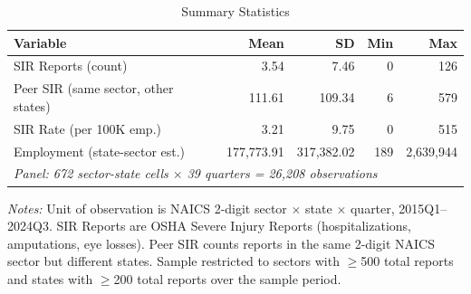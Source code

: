 \begin{table}[t]
\centering
\caption{Summary Statistics}\label{tab:summary}
\begin{tabular}{lrrrr}
\toprule
Variable & Mean & SD & Min & Max \\
\midrule
SIR Reports (count) & 3.54 & 7.46 & 0 & 126 \\
Peer SIR (same sector, other states) & 111.61 & 109.34 & 6 & 579 \\
SIR Rate (per 100K emp.) & 3.21 & 9.75 & 0 & 515 \\
Employment (state-sector est.) & 177,773.91 & 317,382.02 & 189 & 2,639,944 \\
\midrule
\multicolumn{5}{l}{\textit{Panel: 672 sector-state cells $\times$ 39 quarters = 26,208 observations}} \\
\bottomrule
\end{tabular}
\begin{tablenotes}[flushleft]\footnotesize
\item \textit{Notes:} Unit of observation is NAICS 2-digit sector $\times$ state $\times$ quarter, 2015Q1--2024Q3. SIR Reports are OSHA Severe Injury Reports (hospitalizations, amputations, eye losses). Peer SIR counts reports in the same 2-digit NAICS sector but different states. Sample restricted to sectors with $\geq$500 total reports and states with $\geq$200 total reports over the sample period.
\end{tablenotes}
\end{table}

